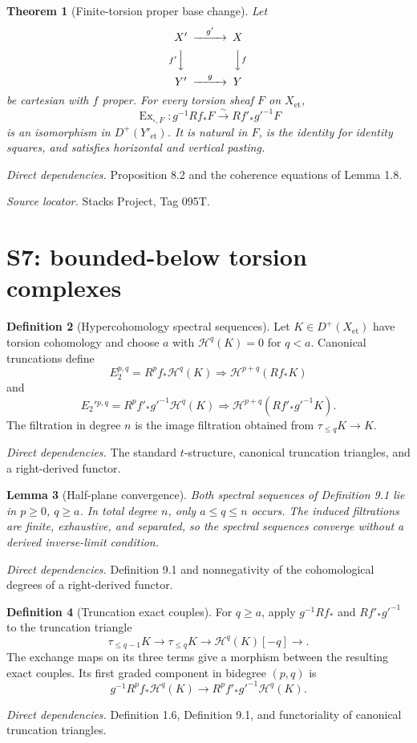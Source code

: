 \documentclass[10pt]{article}
\newtheorem{theorem}{Theorem}[section]
\newtheorem{lemma}[theorem]{Lemma}
\theoremstyle{definition}
\newtheorem{definition}[theorem]{Definition}
\newcommand{\Dplus}{D^+}
\newcommand{\Et}{\mathrm{et}}
\newcommand{\Ex}{\operatorname{Ex}}
\newcommand{\deps}[1]{\par\smallskip\textit{Direct dependencies.} #1\par}
\newcommand{\sources}[1]{\par\textit{Source locator.} #1\par}
\begin{document}
\begin{theorem}[Finite-torsion proper base change]
Let
\[
\begin{CD}
 X' @>{g'}>> X\\
 @V{f'}VV @VV{f}V\\
 Y' @>{g}>> Y
\end{CD}
\]
be cartesian with $f$ proper.  For every torsion sheaf $F$ on $X_{\Et}$,
\[
 \Ex_{\square,F}:g^{-1}Rf_*F
 \xrightarrow{\sim}Rf'_*g'^{-1}F
\]
is an isomorphism in $\Dplus(Y'_{\Et})$.  It is natural in $F$, is the
identity for identity squares, and satisfies horizontal and vertical
pasting.
\end{theorem}
\deps{Proposition 8.2 and the coherence equations of Lemma 1.8.}
\sources{Stacks Project, Tag 095T.}

\section{S7: bounded-below torsion complexes}

\begin{definition}[Hypercohomology spectral sequences]
Let $K\in\Dplus(X_{\Et})$ have torsion cohomology and choose $a$ with
$\mathcal H^q(K)=0$ for $q<a$.  Canonical truncations define
\[
 E_2^{p,q}=R^pf_*\mathcal H^q(K)
 \Longrightarrow\mathcal H^{p+q}(Rf_*K)
\]
and
\[
 E_2'{}^{p,q}=R^pf'_*g'^{-1}\mathcal H^q(K)
 \Longrightarrow\mathcal H^{p+q}(Rf'_*g'^{-1}K).
\]
The filtration in degree $n$ is the image filtration obtained from
$\tau_{\leq q}K\to K$.
\end{definition}
\deps{The standard $t$-structure, canonical truncation triangles, and a
right-derived functor.}

\begin{lemma}[Half-plane convergence]
Both spectral sequences of Definition 9.1 lie in $p\geq0$, $q\geq a$.  In
total degree $n$, only $a\leq q\leq n$ occurs.  The induced filtrations are
finite, exhaustive, and separated, so the spectral sequences converge
without a derived inverse-limit condition.
\end{lemma}
\deps{Definition 9.1 and nonnegativity of the cohomological degrees of a
right-derived functor.}

\begin{definition}[Truncation exact couples]
For $q\geq a$, apply $g^{-1}Rf_*$ and $Rf'_*g'^{-1}$ to the truncation
triangle
\[
 \tau_{\leq q-1}K\to\tau_{\leq q}K
 \to\mathcal H^q(K)[-q]\to.
\]
The exchange maps on its three terms give a morphism between the resulting
exact couples.  Its first graded component in bidegree $(p,q)$ is
\[
 g^{-1}R^pf_*\mathcal H^q(K)\longrightarrow
 R^pf'_*g'^{-1}\mathcal H^q(K).
\]
\end{definition}
\deps{Definition 1.6, Definition 9.1, and functoriality of canonical
truncation triangles.}
\end{document}
